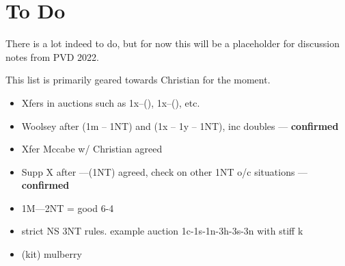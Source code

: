 \documentclass[main]{subfile}
\begin{document}
	
	\chapter{To Do}
	
	There is a lot indeed to do, but for now this will be a placeholder for discussion notes from PVD 2022.
	
	This list is primarily geared towards Christian for the moment.
	
	\begin{itemize}
		\item Xfers in auctions such as 1x--(), 1x--(), etc.
		\item Woolsey after (1m -- 1NT) and (1x -- 1y -- 1NT), inc doubles  --- \textbf{confirmed}
		\item Xfer Mccabe w/ Christian agreed
		\item Supp X after ----(1NT) agreed, check on other 1NT o/c situations --- \textbf{confirmed}
		\item 1M----2NT = good 6-4
		\item strict NS 3NT rules.  example auction 1c-1s-1n-3h-3s-3n with stiff k
		\item (kit) mulberry
	\end{itemize}
\end{document}
